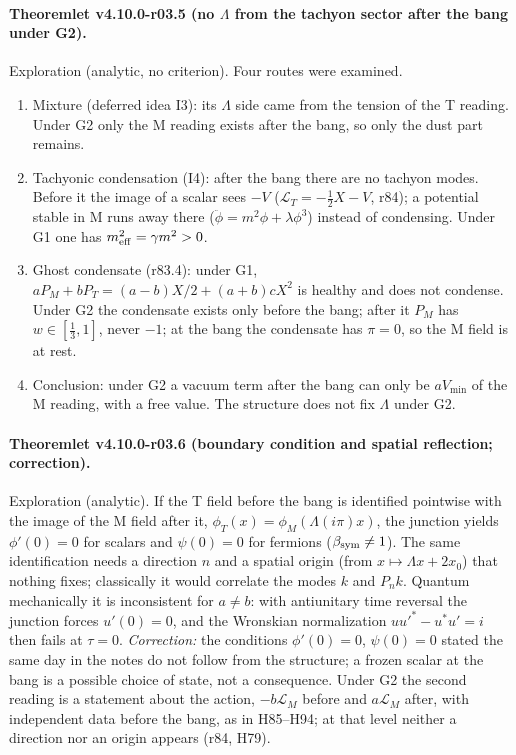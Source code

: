\paragraph{Theoremlet v4.10.0-r03.5 (no \(\Lambda\) from the tachyon sector after the bang under G2).}
Exploration (analytic, no criterion).  Four routes were examined.
\begin{enumerate}[leftmargin=2em]
\item[(a)] Mixture (deferred idea I3): its \(\Lambda\) side came from the tension of the T reading.  Under G2 only the M reading exists after the bang, so
only the dust part remains.
\item[(b)] Tachyonic condensation (I4): after the bang there are no tachyon modes.  Before it the image of a scalar sees \(-V\) (\(\mathcal L_T=-\tfrac12X-V\),
r84); a potential stable in M runs away there (\(\ddot\phi=m^2\phi+\lambda\phi^3\)) instead of condensing.  Under G1 one has \(m_{\rm eff}^2=\gamma m^2>0\).
\item[(c)] Ghost condensate (r83.4): under G1, \(aP_M+bP_T=(a-b)X/2+(a+b)cX^2\) is healthy and does not condense.  Under G2 the condensate exists only
before the bang; after it \(P_M\) has \(w\in[\tfrac13,1]\), never \(-1\); at the bang the condensate has \(\pi=0\), so the M field is at rest.
\item[(d)] Conclusion: under G2 a vacuum term after the bang can only be \(aV_{\min}\) of the M reading, with a free value.  The structure does not fix
\(\Lambda\) under G2.
\end{enumerate}

\paragraph{Theoremlet v4.10.0-r03.6 (boundary condition and spatial reflection; correction).}
Exploration (analytic).  If the T field before the bang is identified pointwise with the image of the M field after it,
\(\phi_T(x)=\phi_M(\Lambda(i\pi)x)\), the junction yields \(\phi'(0)=0\) for scalars and \(\psi(0)=0\) for fermions (\(\beta_{\rm sym}\neq1\)).  The same identification
needs a direction \(n\) and a spatial origin (from \(x\mapsto\Lambda x+2x_0\)) that nothing fixes; classically it would correlate the modes \(k\) and \(P_nk\).
Quantum mechanically it is inconsistent for \(a\neq b\): with antiunitary time reversal the junction forces \(u'(0)=0\), and the Wronskian
normalization \(uu'^*-u^*u'=i\) then fails at \(\tau=0\).  \emph{Correction:} the conditions \(\phi'(0)=0\), \(\psi(0)=0\) stated the same day in the notes do
not follow from the structure; a frozen scalar at the bang is a possible choice of state, not a consequence.  Under G2 the second reading is a
statement about the action, \(-b\mathcal L_M\) before and \(a\mathcal L_M\) after, with independent data before the bang, as in H85--H94; at that level
neither a direction nor an origin appears (r84, H79).

